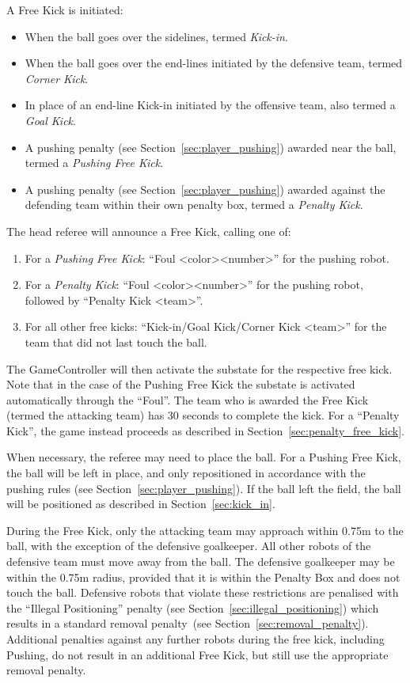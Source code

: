 \documentclass[12pt]{article}
\newcommand{\FreeKickTime}{30 seconds\xspace}
\newcommand{\FreeKickRadius}{0.75m\xspace}
\begin{document}
A Free Kick is initiated:
\begin{itemize}
  \item When the ball goes over the sidelines, termed \emph{Kick-in}.
  \item When the ball goes over the end-lines initiated by the defensive team, termed \emph{Corner Kick}.
  \item In place of an end-line Kick-in initiated by the offensive team, also termed a \emph{Goal Kick}.
  \item A pushing penalty (see Section~\ref{sec:player_pushing}) awarded near the ball, termed a \emph{Pushing Free Kick}.
  \item A pushing penalty (see Section~\ref{sec:player_pushing}) awarded against the defending team within their own penalty box, termed a \textit{Penalty Kick}.
\end{itemize}

The head referee will announce a Free Kick, calling one of:
\begin{enumerate}
  \item For a \textit{Pushing Free Kick}: ``Foul \textless color\textgreater \textless number\textgreater'' for the pushing robot.
  \item For a \textit{Penalty Kick}: ``Foul \textless color\textgreater \textless number\textgreater'' for the pushing robot, followed by ``Penalty Kick \textless team\textgreater''.
  \item For all other free kicks: ``Kick-in/Goal Kick/Corner Kick \textless team\textgreater'' for the team that did not last touch the ball.
\end{enumerate}

The GameController will then activate the substate for the respective free kick. Note that in the case of the Pushing Free Kick the substate is activated automatically through the ``Foul''.
The team who is awarded the Free Kick (termed the attacking team) has \FreeKickTime to complete the kick.
For a ``Penalty Kick'', the game instead proceeds as described in Section~\ref{sec:penalty_free_kick}.

When necessary, the referee may need to place the ball.
For a Pushing Free Kick, the ball will be left in place, and only repositioned in accordance with the pushing rules (see Section~\ref{sec:player_pushing}).
If the ball left the field, the ball will be positioned as described in Section~\ref{sec:kick_in}.

During the Free Kick, only the attacking team may approach within \FreeKickRadius to the ball, with the exception of the defensive goalkeeper. All other robots of the defensive team must move away from the ball. The defensive goalkeeper may be within the \FreeKickRadius radius, provided that it is within the Penalty Box and does not touch the ball. Defensive robots that violate these restrictions are penalised with the ``Illegal Positioning'' penalty (see Section~\ref{sec:illegal_positioning}) which results in a standard removal penalty~(see Section~\ref{sec:removal_penalty}).
Additional penalties against any further robots during the free kick, including Pushing, do not result in an additional Free Kick, but still use the appropriate removal penalty.
\end{document}
